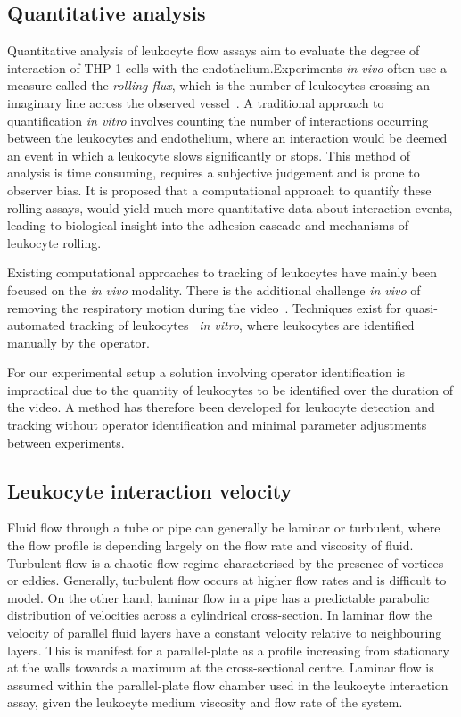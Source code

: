 \subsection{Quantitative analysis}
\label{leukocytes:introduction:quantitative}
Quantitative analysis of leukocyte flow assays aim to evaluate the degree of interaction of THP-1 cells with the endothelium.Experiments \emph{in vivo} often use a measure called the \emph{rolling flux}, which is the number of leukocytes crossing an imaginary line across the observed vessel~\cite{Sperandio2006}. A traditional approach to quantification \emph{in vitro} involves counting the number of interactions occurring between the leukocytes and endothelium, where an interaction would be deemed an event in which a leukocyte slows significantly or stops. This method of analysis is time consuming, requires a subjective judgement and is prone to observer bias. It is proposed that a computational approach to quantify these rolling assays, would yield much more quantitative data about interaction events, leading to biological insight into the adhesion cascade and mechanisms of leukocyte rolling.

Existing computational approaches to tracking of leukocytes have mainly been focused on the \emph{in vivo} modality. There is the additional challenge \emph{in vivo} of removing the respiratory motion during the video~\cite{Ray2002,Sperandio2006}. Techniques exist for quasi-automated tracking of leukocytes~\cite{Acton2002, Debeir2005} \emph{in vitro}, where leukocytes are identified manually by the operator.

For our experimental setup a solution involving operator identification is impractical due to the quantity of leukocytes to be identified over the duration of the video. A method has therefore been developed for leukocyte detection and tracking without operator identification and minimal parameter adjustments between experiments.

\subsection{Leukocyte interaction velocity}
\label{leukocytes:introduction:velocity}
Fluid flow through a tube or pipe can generally be laminar or turbulent, where the flow profile is depending largely on the flow rate and viscosity of fluid. Turbulent flow is a chaotic flow regime characterised by the presence of vortices or eddies. Generally, turbulent flow occurs at higher flow rates and is difficult to model. On the other hand, laminar flow in a pipe has a predictable parabolic distribution of velocities across a cylindrical cross-section. In laminar flow the velocity of parallel fluid layers have a constant velocity relative to neighbouring layers. This is manifest for a parallel-plate as a profile increasing from stationary at the walls towards a maximum at the cross-sectional centre. Laminar flow is assumed within the parallel-plate flow chamber used in the leukocyte interaction assay, given the leukocyte medium viscosity and flow rate of the system.

